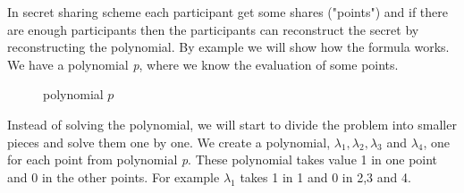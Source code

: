 \noindent
In secret sharing scheme each participant get some shares ("points") and if there are enough participants then the participants can reconstruct the secret by reconstructing the polynomial. By example we will show how the formula works.  We have a polynomial \textit{p}, where we know the evaluation of some points.

\begin{figure}[H]
    \centering
    \caption{polynomial $p$}
\end{figure}

\noindent
Instead of solving the polynomial, we will start to divide the problem into smaller pieces and solve them one by one. We create a polynomial, \begin{math} \lambda_1, \lambda_2, \lambda_3\end{math} and \begin{math}\lambda_4\end{math}, one for each point from polynomial \textit{p}. These polynomial takes value 1 in one point and 0 in the other points. For example \begin{math} \lambda_1\end{math} takes 1 in 1 and 0 in 2,3 and 4.

